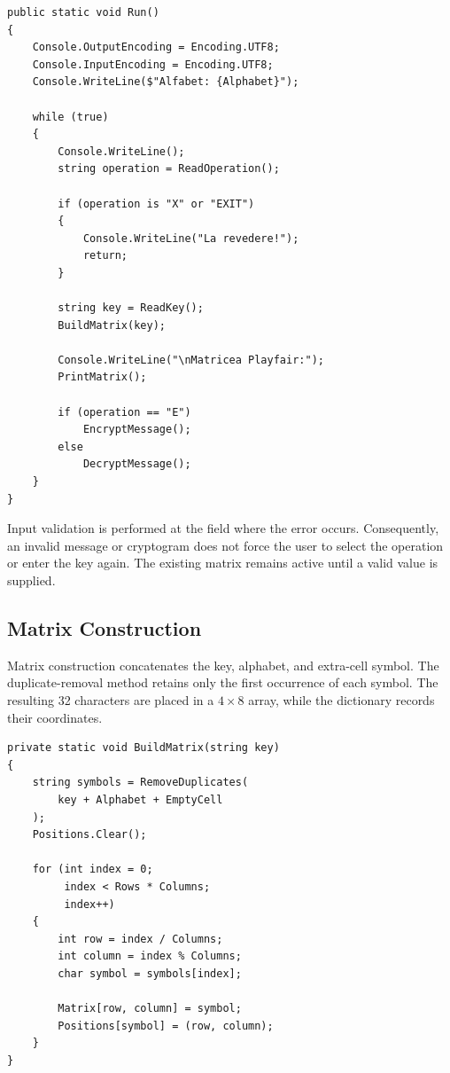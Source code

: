 \documentclass[12pt,a4paper]{article}
\begin{document}
\begin{lstlisting}[style=csharp,caption={Continuous operation loop}]
public static void Run()
{
    Console.OutputEncoding = Encoding.UTF8;
    Console.InputEncoding = Encoding.UTF8;
    Console.WriteLine($"Alfabet: {Alphabet}");

    while (true)
    {
        Console.WriteLine();
        string operation = ReadOperation();

        if (operation is "X" or "EXIT")
        {
            Console.WriteLine("La revedere!");
            return;
        }

        string key = ReadKey();
        BuildMatrix(key);

        Console.WriteLine("\nMatricea Playfair:");
        PrintMatrix();

        if (operation == "E")
            EncryptMessage();
        else
            DecryptMessage();
    }
}
\end{lstlisting}

Input validation is performed at the field where the error occurs. Consequently, an invalid message or cryptogram does not force the user to select the operation or enter the key again. The existing matrix remains active until a valid value is supplied.

\subsection{Matrix Construction}

Matrix construction concatenates the key, alphabet, and extra-cell symbol. The duplicate-removal method retains only the first occurrence of each symbol. The resulting 32 characters are placed in a $4\times8$ array, while the dictionary records their coordinates.

\begin{lstlisting}[style=csharp,caption={Construction of the keyed Playfair matrix}]
private static void BuildMatrix(string key)
{
    string symbols = RemoveDuplicates(
        key + Alphabet + EmptyCell
    );
    Positions.Clear();

    for (int index = 0;
         index < Rows * Columns;
         index++)
    {
        int row = index / Columns;
        int column = index % Columns;
        char symbol = symbols[index];

        Matrix[row, column] = symbol;
        Positions[symbol] = (row, column);
    }
}
\end{lstlisting}
\end{document}
